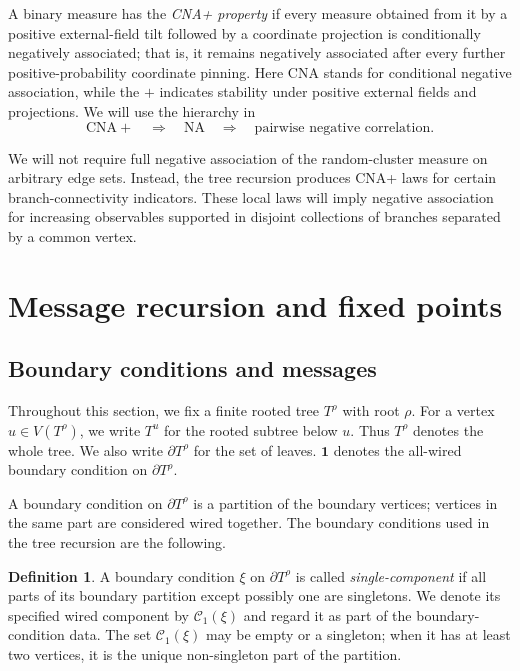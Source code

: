 \documentclass[11pt]{amsart}
\theoremstyle{plain}
\theoremstyle{definition}
\newtheorem{definition}[theorem]{Definition}
\theoremstyle{remark}
\begin{document}
A binary measure has the \emph{CNA+ property} if every measure obtained from it by a positive external-field tilt followed by a coordinate projection is conditionally negatively associated; that is, it remains negatively associated after every further positive-probability coordinate pinning. Here CNA stands for conditional negative association, while the $+$ indicates stability under positive external fields and projections. We will use the hierarchy in~\cite{pemantle2000towards}
\[
    \mathrm{CNA+}
    \quad\Longrightarrow\quad
    \mathrm{NA}
    \quad\Longrightarrow\quad
    \text{pairwise negative correlation}.
\]

We will not require full negative association of the random-cluster measure on arbitrary edge sets. Instead, the tree recursion produces CNA+ laws for certain branch-connectivity indicators. These local laws will imply negative association for increasing observables supported in disjoint collections of branches separated by a common vertex.

\section{Message recursion and fixed points}
\label{sec:message-fixed-points}
\subsection{Boundary conditions and messages}
\label{subsec:boundary-messages}

Throughout this section, we fix a finite rooted tree $T^\rho$ with root $\rho$. For a vertex $u\in V(T^\rho)$, we write $T^u$ for the rooted subtree below $u$. Thus $T^\rho$ denotes the whole tree. We also write $\partial T^\rho$ for the set of leaves. $\mathbf 1$ denotes the all-wired boundary condition on $\partial T^\rho$.

A boundary condition on $\partial T^\rho$ is a partition of the boundary vertices; vertices in the same part are considered wired together. The boundary conditions used in the tree recursion are the following.

\begin{definition}
\label{def:single-component-bc}
A boundary condition $\xi$ on $\partial T^\rho$ is called \emph{single-component} if all parts of its boundary partition except possibly one are singletons. We denote its specified wired component by $\mathcal C_1(\xi)$ and regard it as part of the boundary-condition data. The set $\mathcal C_1(\xi)$ may be empty or a singleton; when it has at least two vertices, it is the unique non-singleton part of the partition.
\end{definition}
\end{document}
